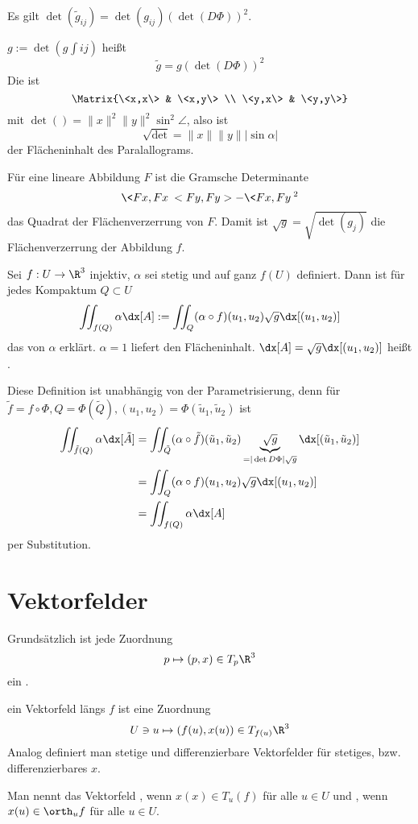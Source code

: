 Es gilt $\det(\tilde g_{ij}) = \det(g_{ij}) (\det(D\Phi))^2$.

$g := \det(g_{}∫ij)$ heißt 
\[
	\tilde g = g (\det(D\Phi))^2
\]
Die  ist
\[
	\Matrix{\<x,x\> & \<x,y\> \\ \<y,x\> & \<y,y\>}
\]
mit $\det() = \|x\|^2 \|y\|^2 \sin^2 \angle$, also ist
\[
	\sqrt{\det}
	= \|x\|\|y\| |\sin \alpha|
\]
der Flächeninhalt des Paralallograms.

Für eine lineare Abbildung $F$ ist die Gramsche Determinante
\[
	\<Fx, Fx\> <Fy, Fy> - \<Fx, Fy\>^2
\]
das Quadrat der Flächenverzerrung von $F$.
Damit ist $\sqrt{g} = \sqrt{\det(g_{j})}$ die Flächenverzerrung der Abbildung $f$.

\begin{df}[Oberflächenintegral]
	Sei $f: U \to \R^3$ injektiv, $\alpha$ sei stetig und auf ganz $f(U)$ definiert.
	Dann ist für jedes Kompaktum $Q \subset U$
	\[
		\iint_{f(Q)} \alpha \dx[A]
		:= \iint_{Q} (\alpha \circ f)(u_1, u_2) \sqrt{g} \dx[(u_1, u_2)]
	\]
	das  von $\alpha$ erklärt.
	$\alpha = 1$ liefert den Flächeninhalt.
	$\dx[A] = \sqrt{g} \dx[(u_1, u_2)]$ heißt .
	\begin{note}
		Diese Definition ist unabhängig von der Parametrisierung, denn für $\tilde f = f \circ \Phi, Q = \Phi(\tilde Q), (u_1,u_2) = \Phi(\tilde u_1, \tilde u_2)$ ist
		\begin{align*}
			\iint_{\tilde f(Q)} \alpha \dx[\tilde A]
			&= \iint_{\tilde Q} (\alpha \circ \tilde f)(\tilde u_1, \tilde u_2) \underbrace{\sqrt{g}}_{=|\det D\Phi| \sqrt{g}} \dx[(\tilde u_1, \tilde u_2)] \\
			&= \iint_{Q} (\alpha \circ f) (u_1, u_2) \sqrt{g} \dx[(u_1, u_2)] \\
			&= \iint_{f(Q)} \alpha \dx[A]
		\end{align*}
		per Substitution.
	\end{note}
\end{df}

\section{Vektorfelder}


Grundsätzlich ist jede Zuordnung
\[
	p \mapsto (p, x) \in T_p\R^3
\]
ein .

\begin{df}
	ein Vektorfeld längs $f$ ist eine Zuordnung
	\[
		U \ni u \mapsto (f(u), x(u)) \in T_{f(u)} \R^3
	\]
	Analog definiert man stetige und differenzierbare Vektorfelder für stetiges, bzw. differenzierbares $x$.

	Man nennt das Vektorfeld , wenn $x(x) \in T_u(f)$ für alle $u \in U$ und , wenn $x(u) \in \orth_u f$ für alle $u \in U$.
\end{df}

